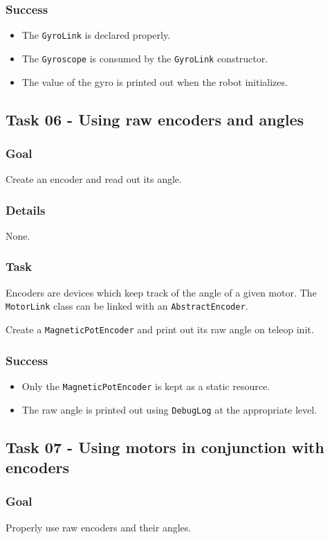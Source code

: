 \documentclass[a4paper]{article}
\begin{document}
\subsubsection{Success}\begin{itemize}\item{The \lstinline{GyroLink} is declared properly.}\item{The \lstinline{Gyroscope} is consumed by the \lstinline{GyroLink} constructor.}\item{The value of the gyro is printed out when the robot initializes.}\end{itemize}

\subsection{Task 06 - Using raw encoders and angles}
\subsubsection{Goal} Create an encoder and read out its angle.
\subsubsection{Details} None.
\subsubsection{Task} Encoders are devices which keep track of the angle of a given motor. The \lstinline{MotorLink} class can be linked with an \lstinline{AbstractEncoder}.

Create a \lstinline{MagneticPotEncoder} and print out its raw angle on teleop init.
\subsubsection{Success} \begin{itemize}\item{Only the \lstinline{MagneticPotEncoder} is kept as a static resource.}\item{The raw angle is printed out using \lstinline{DebugLog} at the appropriate level.}\end{itemize}

\subsection{Task 07 - Using motors in conjunction with encoders}
\subsubsection{Goal} Properly use raw encoders and their angles.
\end{document}

